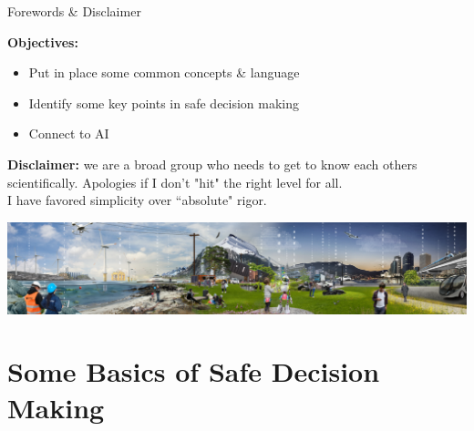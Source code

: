 \documentclass[lecture]{beamer}
\begin{document}
\begin{frame}{\normalsize Forewords \& Disclaimer}
\footnotesize

\textbf{Objectives:}
\begin{itemize}
\item Put in place some common concepts \& language
\item Identify some key points in safe decision making 
\item Connect to AI
\end{itemize}
\center
\textbf{Disclaimer:} we are a broad group who needs to get to know each others scientifically. Apologies if I don't "hit" the right level for all. \\I have favored simplicity over ``absolute" rigor. 

\vspace{1cm}
\includegraphics[width=1\textwidth,clip]{Figures/SmartGridLab.pdf}

\end{frame}

\section{Some Basics of Safe Decision Making}
\end{document}
